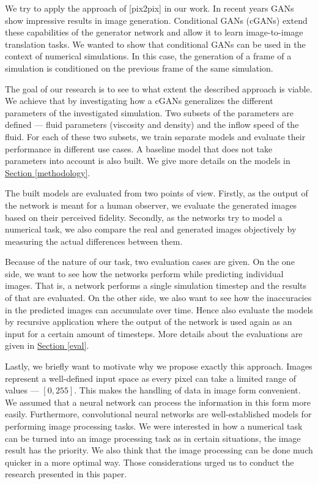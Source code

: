 \documentclass{llncs}
\newcommand{\refsec}[1]{\hyperref[#1]{Section \ref*{#1}}}
\begin{document}
We try to apply the approach of [pix2pix] in our work. In recent years GANs show impressive results in image generation. Conditional GANs (cGANs) extend these capabilities of the generator network and allow it to learn image-to-image translation tasks. We wanted to show that conditional GANs can be used in the context of numerical simulations. In this case, the generation of a frame of a simulation is conditioned on the previous frame of the same simulation.

The goal of our research is to see to what extent the described approach is viable. We achieve that by investigating how a cGANs generalizes the different parameters of the investigated simulation. Two subsets of the parameters are defined --- fluid parameters (viscosity and density) and the inflow speed of the fluid. For each of these two subsets, we train separate models and evaluate their performance in different use cases. A baseline model that does not take parameters into account is also built. We give more details on the models in \refsec{methodology}.

The built models are evaluated from two points of view. Firstly, as the output of the network is meant for a human observer, we evaluate the generated images based on their perceived fidelity. Secondly, as the networks try to model a numerical task, we also compare the real and generated images objectively by measuring the actual differences between them.

Because of the nature of our task, two evaluation cases are given. On the one side, we want to see how the networks perform while predicting individual images. That is, a network performs a single simulation timestep and the results of that are evaluated. On the other side, we also want to see how the inaccuracies in the predicted images can accumulate over time. Hence also evaluate the models by recursive application where the output of the network is used again as an input for a certain amount of timesteps. More details about the evaluations are given in \refsec{eval}.

Lastly, we briefly want to motivate why we propose exactly this approach. Images represent a well-defined input space as every pixel can take a limited range of values --- $[0, 255]$. This makes the handling of data in image form convenient. We assumed that a neural network can process the information in this form more easily. Furthermore, convolutional neural networks are well-established models for performing image processing tasks. We were interested in how a numerical task can be turned into an image processing task as in certain situations, the image result has the priority. We also think that the image processing can be done much quicker in a more optimal way. Those considerations urged us to conduct the research presented in this paper.
\end{document}
